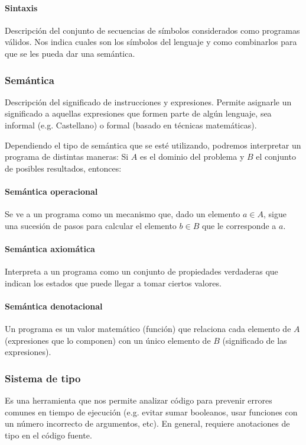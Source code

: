 \paragraph{Sintaxis} Descripción del conjunto de secuencias de símbolos considerados como programas válidos. Nos indica cuales son los símbolos del lenguaje y como combinarlos para que se les pueda dar una semántica.

\subsubsection{Semántica}

Descripción del significado de instrucciones y expresiones. Permite asignarle un significado a aquellas expresiones que formen parte de algún lenguaje, sea informal (e.g. Castellano) o formal (basado en técnicas matemáticas).

Dependiendo el tipo de semántica que se esté utilizando, podremos interpretar un programa de distintas maneras:  Si $A$ es el dominio del problema y $B$ el conjunto de posibles resultados, entonces:

\paragraph{Semántica operacional} Se ve a un programa como un mecanismo que, dado un elemento $a\in A $, sigue una sucesión de pasos para calcular el elemento $b \in B$ que le corresponde  a $a$.

\paragraph{Semántica axiomática} Interpreta a un programa como un conjunto de propiedades verdaderas que indican los estados que puede llegar a tomar ciertos valores.

\paragraph{Semántica denotacional} Un programa es un valor matemático (función) que relaciona cada elemento de $A$ (expresiones que lo componen) con un único elemento de $B$ (significado de las expresiones).

\subsubsection{Sistema de tipo}
Es una herramienta que nos permite analizar código para prevenir errores comunes en tiempo de ejecución (e.g. evitar sumar booleanos, usar funciones con un número incorrecto de argumentos, etc). En general, requiere anotaciones de tipo en el código fuente. 

